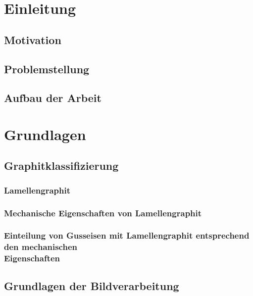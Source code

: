 \documentclass[
fontsize=10pt, 
listof = totoc,
parskip = half	
]{report}
\begin{document}
\chapter{Einleitung}
\label{ch:Einleitung}

\section{Motivation}
\label{sec:Motivation}

\section{Problemstellung}
\label{sec:Problemstellung}

\section{Aufbau der Arbeit}
\label{sec:AufbauDerArbeit}

\newpage

\chapter{Grundlagen}
\label{ch:Grundlagen}

\section{Graphitklassifizierung}
\label{sec:Graphitklassifizierung}

\subsection{Lamellengraphit}
\label{subsec:Lamellengraphit}

\subsection{Mechanische Eigenschaften von Lamellengraphit}
\label{subsec:MechanischeEigenschaften}

\subsection{Einteilung von Gusseisen mit Lamellengraphit entsprechend den mechanischen\\ Eigenschaften}
\label{subsec:EinteilungLamellengraphit}

\section{Grundlagen der Bildverarbeitung}
\label{GrundlagenBildverarbeitung}
\end{document}
